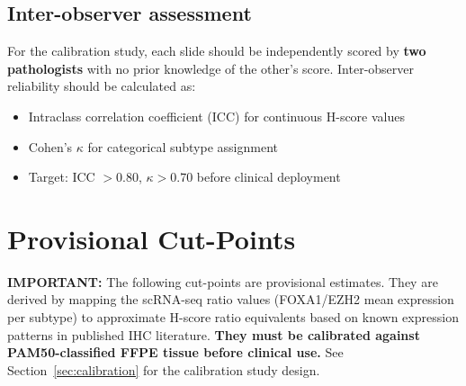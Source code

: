 \documentclass[11pt, a4paper]{article}
\begin{document}
\subsection{Inter-observer assessment}

For the calibration study, each slide should be
independently scored by \textbf{two pathologists}
with no prior knowledge of the other's score.
Inter-observer reliability should be calculated
as:
\begin{itemize}
    \item Intraclass correlation coefficient (ICC)
    for continuous H-score values
    \item Cohen's $\kappa$ for categorical subtype
    assignment
    \item Target: ICC $> 0.80$, $\kappa > 0.70$
    before clinical deployment
\end{itemize}

\section{Provisional Cut-Points}
\label{sec:cutpoints}

\begin{mdframed}[backgroundcolor=warningbox,
                 linecolor=orange!70!black,
                 linewidth=1pt]
\textbf{IMPORTANT:} The following cut-points
are provisional estimates. They are derived by
mapping the scRNA-seq ratio values (FOXA1/EZH2
mean expression per subtype) to approximate
H-score ratio equivalents based on known
expression patterns in published IHC literature.
\textbf{They must be calibrated against
PAM50-classified FFPE tissue before clinical use.}
See Section~\ref{sec:calibration} for the
calibration study design.
\end{mdframed}
\end{document}
